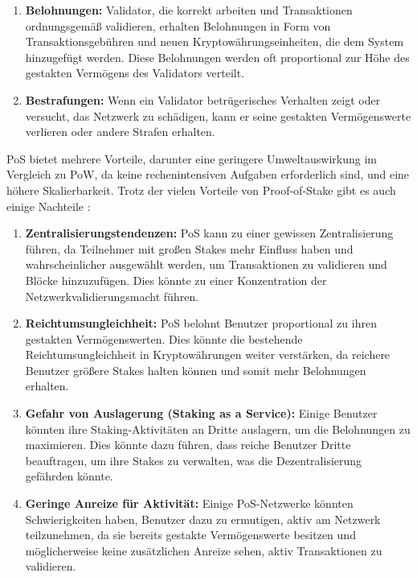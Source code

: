 \begin{itemize}
\begin{enumerate}
		\item \textbf{Belohnungen:} Validator, die korrekt arbeiten und Transaktionen ordnungsgemäß validieren, erhalten Belohnungen in Form von Transaktionsgebühren und neuen Kryptowährungseinheiten, die dem System hinzugefügt werden. Diese Belohnungen werden oft proportional zur Höhe des gestakten Vermögens des Validators verteilt.
		
		\item \textbf{Bestrafungen:} Wenn ein Validator betrügerisches Verhalten zeigt oder versucht, das Netzwerk zu schädigen, kann er seine gestakten Vermögenswerte verlieren oder andere Strafen erhalten.
	\end{enumerate}
	PoS \cite{ID53}bietet mehrere Vorteile, darunter eine geringere Umweltauswirkung im Vergleich zu PoW, da keine rechenintensiven Aufgaben erforderlich sind, und eine höhere Skalierbarkeit. Trotz der vielen Vorteile von Proof-of-Stake gibt es auch einige Nachteile \cite{ID53}:
	
	\begin{enumerate}
		\item \textbf{Zentralisierungstendenzen:} PoS kann zu einer gewissen Zentralisierung führen, da Teilnehmer mit großen Stakes mehr Einfluss haben und wahrscheinlicher ausgewählt werden, um Transaktionen zu validieren und Blöcke hinzuzufügen. Dies könnte zu einer Konzentration der Netzwerkvalidierungsmacht führen.
		
		\item \textbf{Reichtumsungleichheit:} PoS belohnt Benutzer proportional zu ihren gestakten Vermögenswerten. Dies könnte die bestehende Reichtumsungleichheit in Kryptowährungen weiter verstärken, da reichere Benutzer größere Stakes halten können und somit mehr Belohnungen erhalten.
		
		\item \textbf{Gefahr von Auslagerung (Staking as a Service):} Einige Benutzer könnten ihre Staking-Aktivitäten an Dritte auslagern, um die Belohnungen zu maximieren. Dies könnte dazu führen, dass reiche Benutzer Dritte beauftragen, um ihre Stakes zu verwalten, was die Dezentralisierung gefährden könnte.
		
		\item \textbf{Geringe Anreize für Aktivität:} Einige PoS-Netzwerke könnten Schwierigkeiten haben, Benutzer dazu zu ermutigen, aktiv am Netzwerk teilzunehmen, da sie bereits gestakte Vermögenswerte besitzen und möglicherweise keine zusätzlichen Anreize sehen, aktiv Transaktionen zu validieren.
		

\end{enumerate}
\end{itemize}
